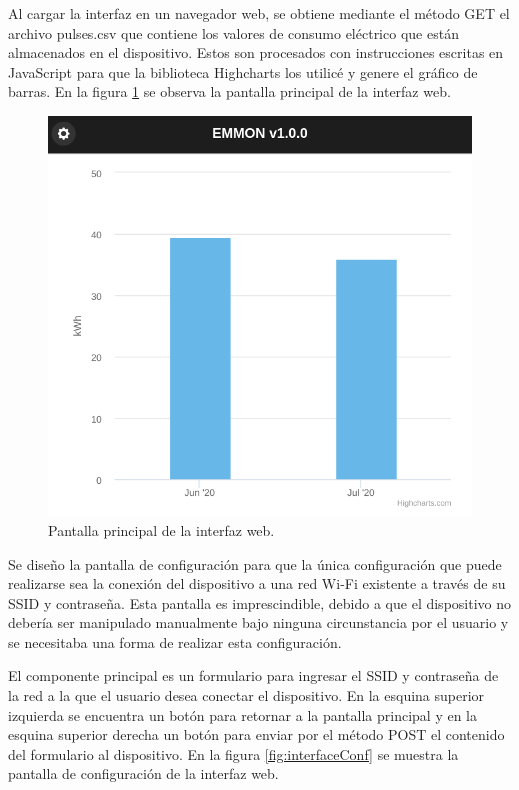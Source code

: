 Al cargar la interfaz en un navegador web, se obtiene mediante el método GET el archivo pulses.csv que contiene los valores de consumo eléctrico que están almacenados en el dispositivo. Estos son procesados con instrucciones escritas en JavaScript para que la biblioteca Highcharts los utilicé y genere el gráfico de barras. En la figura \ref{fig:interfaceMain} se observa la pantalla principal de la interfaz web.

\begin{figure}[h]
	\centering
	\includegraphics[scale=0.3]{./Figures/interface_main.png}
	\caption{Pantalla principal de la interfaz web.}
	\label{fig:interfaceMain}
\end{figure}

Se diseño la pantalla de configuración para que la única configuración que puede realizarse sea la conexión del dispositivo a una red Wi-Fi existente a través de su SSID y contraseña. Esta pantalla es imprescindible, debido a que el dispositivo no debería ser manipulado manualmente bajo ninguna circunstancia por el usuario y se necesitaba una forma de realizar esta configuración.

El componente principal es un formulario para ingresar el SSID y contraseña de la red a la que el usuario desea conectar el dispositivo. En la esquina superior izquierda se encuentra un botón para retornar a la pantalla principal y en la esquina superior derecha un botón para enviar por el método POST el contenido del formulario al dispositivo. En la figura \ref{fig:interfaceConf} se muestra la pantalla de configuración de la interfaz web.

